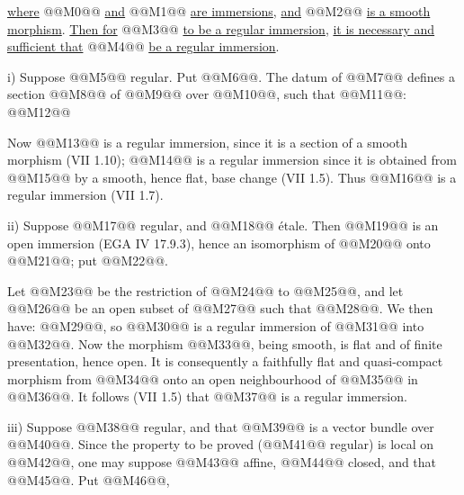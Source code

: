\uline{where} @@M0@@ \uline{and} @@M1@@
\uline{are immersions}, \uline{and} @@M2@@ \uline{is a smooth morphism}. \uline{Then for} @@M3@@ \uline{to be a regular immersion}, \uline{it is necessary and sufficient that} @@M4@@ \uline{be a regular immersion}.

i) Suppose @@M5@@ regular. Put @@M6@@. The datum of @@M7@@ defines a section @@M8@@ of @@M9@@ over @@M10@@, such that @@M11@@:
@@M12@@

Now @@M13@@ is a regular immersion, since it is a section of a smooth morphism (VII 1.10); @@M14@@ is a regular immersion since it is obtained from @@M15@@ by a smooth, hence flat, base change (VII 1.5). Thus @@M16@@ is a regular immersion (VII 1.7).

ii) Suppose @@M17@@ regular, and @@M18@@ étale. Then @@M19@@ is an open immersion (EGA IV 17.9.3), hence an isomorphism of @@M20@@ onto @@M21@@; put @@M22@@.

Let @@M23@@ be the restriction of @@M24@@ to @@M25@@, and let @@M26@@ be an open subset of @@M27@@ such that @@M28@@. We then have: @@M29@@, so @@M30@@ is a regular immersion of @@M31@@ into @@M32@@. Now the morphism @@M33@@, being smooth, is flat and of finite presentation, hence open. It is consequently a faithfully flat and quasi-compact morphism from @@M34@@ onto an open neighbourhood of @@M35@@ in @@M36@@. It follows (VII 1.5) that @@M37@@ is a regular immersion.

iii) Suppose @@M38@@ regular, and that @@M39@@ is a vector bundle over @@M40@@. Since the property to be proved (@@M41@@ regular) is local on @@M42@@, one may suppose @@M43@@ affine, @@M44@@ closed, and that @@M45@@. Put @@M46@@,
